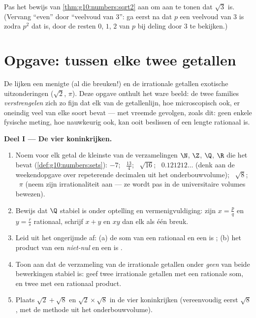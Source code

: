 \begin{exercise}[$\star\star\star$]\label{exo:g10:numbers:10}
Pas het bewijs van \cref{thm:g10:numbers:sqrt2} aan om aan te tonen dat
$\sqrt 3$  is. (Vervang ``even'' door ``veelvoud van $3$'': ga
eerst na dat $p$ een veelvoud van $3$ is zodra $p^2$ dat is, door de resten
$0$, $1$, $2$ van $p$ bij deling door $3$ te bekijken.)
\end{exercise}

\section{Opgave: tussen elke twee getallen}

\begin{problem}
\label{pb:g10:numbers:1}
De  lijken een menigte (al die breuken!) en de irrationale
getallen exotische uitzonderingen ($\sqrt2$, $\pi$). Deze opgave onthult het
ware beeld: de twee families \emph{verstrengelen} zich zo fijn dat elk
 van de getallenlijn, hoe microscopisch ook, er oneindig veel van
elke soort bevat --- met vreemde gevolgen, zoals dit: geen enkele fysische
meting, hoe nauwkeurig ook, kan ooit beslissen of een lengte rationaal is.

\medskip
\noindent\textbf{Deel I --- De vier koninkrijken.}
\begin{enumerate}
  \item Noem voor elk getal de kleinste van de verzamelingen $\N$, $\Z$,
        $\Q$, $\R$ die het bevat (\cref{def:g10:numbers:sets}): $-7$; \
        $\frac{13}{4}$; \ $\sqrt{16}$; \ $0.121212\ldots$ (denk aan de
        weekendopgave over repeterende decimalen uit het onderbouwvolume); \
        $\sqrt8$; \ $\pi$ (neem zijn irrationaliteit aan --- ze wordt pas in
        de universitaire volumes bewezen).
  \item Bewijs dat $\Q$ stabiel is onder optelling en vermenigvuldiging: zijn
        $x = \frac pq$ en $y = \frac rs$ rationaal, schrijf $x + y$ en $xy$
        dan elk als één breuk.
  \item Leid uit het ongerijmde af: (a) de som van een rationaal en een
         is ; (b) het product van een
        \emph{niet-nul} \omterm{def:g10:numbers:sets}{rationaal getal} en een  is
        \omterm{ex:g10:numbers:classify}{irrationaal}.
  \item Toon aan dat de verzameling van de irrationale getallen onder
        \emph{geen} van beide bewerkingen stabiel is: geef twee irrationale
        getallen met een rationale som, en twee met een rationaal product.
  \item Plaats $\sqrt2 + \sqrt8$ en $\sqrt2 \times \sqrt8$ in de vier
        koninkrijken (vereenvoudig eerst $\sqrt8$, met de methode uit het
        onderbouwvolume).
\end{enumerate}


\end{problem}
